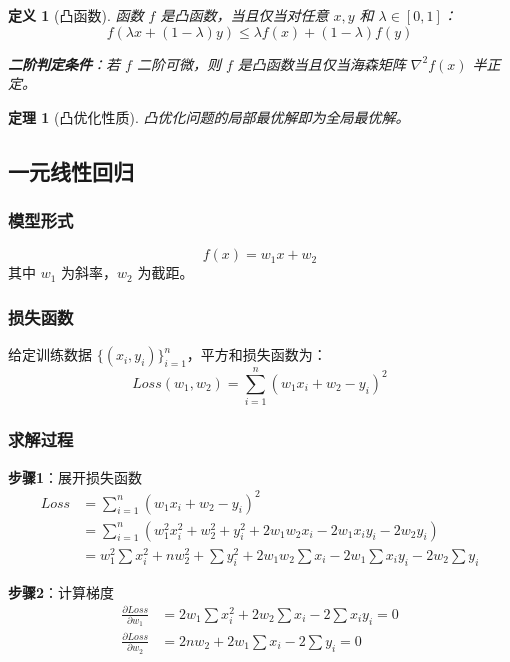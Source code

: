 \documentclass[12pt,a4paper]{ctexart}
\newtheorem{definition}{定义}[section]
\newtheorem{theorem}{定理}[section]
\begin{document}
\begin{definition}[凸函数]
函数 $f$ 是凸函数，当且仅当对任意 $x, y$ 和 $\lambda \in [0,1]$：
\[
f(\lambda x + (1-\lambda)y) \leq \lambda f(x) + (1-\lambda)f(y)
\]

\textbf{二阶判定条件}：若 $f$ 二阶可微，则 $f$ 是凸函数当且仅当海森矩阵 $\nabla^2 f(x)$ 半正定。
\end{definition}

\begin{theorem}[凸优化性质]
凸优化问题的局部最优解即为全局最优解。
\end{theorem}

\subsection{一元线性回归}

\subsubsection{模型形式}

\[
f(x) = w_1 x + w_2
\]
其中 $w_1$ 为斜率，$w_2$ 为截距。

\subsubsection{损失函数}

给定训练数据 $\{(x_i, y_i)\}_{i=1}^{n}$，平方和损失函数为：
\[
Loss(w_1, w_2) = \sum_{i=1}^{n}(w_1 x_i + w_2 - y_i)^2
\]

\subsubsection{求解过程}

\textbf{步骤1}：展开损失函数
\begin{align*}
Loss &= \sum_{i=1}^{n}(w_1 x_i + w_2 - y_i)^2 \\
&= \sum_{i=1}^{n}(w_1^2 x_i^2 + w_2^2 + y_i^2 + 2w_1w_2x_i - 2w_1x_iy_i - 2w_2y_i) \\
&= w_1^2\sum x_i^2 + nw_2^2 + \sum y_i^2 + 2w_1w_2\sum x_i - 2w_1\sum x_iy_i - 2w_2\sum y_i
\end{align*}

\textbf{步骤2}：计算梯度
\begin{align*}
\frac{\partial Loss}{\partial w_1} &= 2w_1\sum x_i^2 + 2w_2\sum x_i - 2\sum x_iy_i = 0 \\
\frac{\partial Loss}{\partial w_2} &= 2nw_2 + 2w_1\sum x_i - 2\sum y_i = 0
\end{align*}
\end{document}
